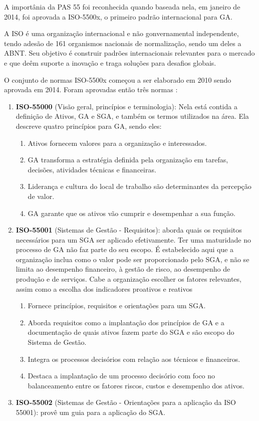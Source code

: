 A importânia da PAS 55 foi reconhecida quando baseada nela, em janeiro de 2014, foi aprovada a ISO-5500x, o primeiro padrão internacional para GA. 

A ISO é uma organização internacional e não gonvernamental independente, tendo adesão de 161 organismos nacionais de normalização, sendo um deles a ABNT. Seu objetivo é construir padrões internacionais relevantes para o mercado e que deêm suporte a inovação e traga soluções para desafios globais.

O conjunto de normas ISO-5500x começou a ser elaborado em 2010 sendo aprovada em 2014. Foram aprovadas então três normas \cite{abraman}:

\begin{enumerate}
	\item \textbf{ISO-55000} (Visão geral, princípios e terminologia): Nela está contida a definição de Ativos, GA e SGA, e também os termos utilizados na área. Ela descreve quatro princípios para GA, sendo eles:
		\begin{enumerate}
			\item Ativos fornecem valores para a organização e interessados.
			\item GA transforma a estratégia definida pela organização em tarefas, decisões, atividades técnicas e financeiras.
			\item Liderança e cultura do local de trabalho são determinantes da percepção de valor.
			\item GA garante que os ativos vão cumprir e desempenhar a sua função.
		\end{enumerate}
	\item \textbf{ISO-55001} (Sistemas de Gestão - Requisitos): aborda quais os requisitos necessários para um SGA ser aplicado efetivamente. Ter uma maturidade no processo de GA não faz parte do seu escopo. É estabelecido aqui que a organização inclua como o valor pode ser proporcionado pelo SGA, e não se limita ao desempenho financeiro, à gestão de risco, ao desempenho de produção e de serviços. Cabe a organização escolher os fatores relevantes, assim como a escolha dos indicadores proativos e reativos
		\begin{enumerate}
			\item Fornece princípios, requisitos e orientações para um SGA.
			\item Aborda requisitos como a implantação dos princípios de GA e a documentação de quais ativos fazem parte do SGA e são escopo do Sistema de Gestão.
			\item Integra os processos decisórios com relação aos técnicos e financeiros.
			\item Destaca a implantação de um processo decisório com foco no balanceamento entre os fatores riscos, custos e desempenho dos ativos.
		\end{enumerate}
	\item \textbf{ISO-55002} (Sistemas de Gestão - Orientações para a aplicação da ISO 55001): provê um guia para a aplicação do SGA. 
\end{enumerate}

